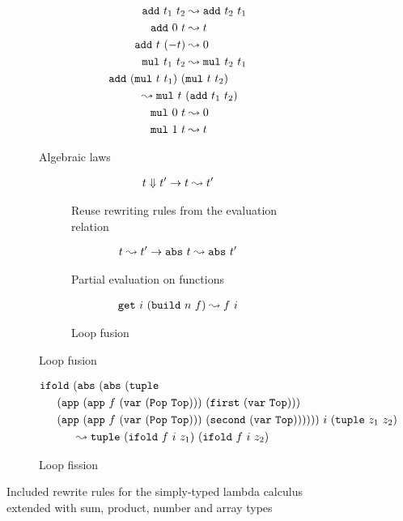 \begin{figure}[]
  \centering
  \begin{subfigure}{0.48\textwidth}
    \centering
    \begin{align*}
      \texttt{add}\ t_1\ t_2 &\leadsto \texttt{add}\ t_2\ t_1 \\
      \texttt{add}\ 0\ t &\leadsto t \\
      \texttt{add}\ t\ (-t) &\leadsto 0 \\
      \texttt{mul}\ t_1\ t_2 &\leadsto \texttt{mul}\ t_2\ t_1 \\
      \texttt{add}\ (\texttt{mul}\ t\ t_1)\ (&\texttt{mul}\ t\ t_2) \\
        \leadsto \texttt{mul}\ t\ &(\texttt{add}\ t_1\ t_2) \\
      \texttt{mul}\ 0\ t &\leadsto 0 \\
      \texttt{mul}\ 1\ t &\leadsto t
    \end{align*}
    \caption{Algebraic laws}
  \end{subfigure}
  \begin{subfigure}{0.48\textwidth}
    \begin{subfigure}{1\textwidth}
      \begin{align*}
        t \Downarrow t' \to t \leadsto t'
      \end{align*}
      \caption{Reuse rewriting rules from the evaluation relation}
    \end{subfigure}
    \begin{subfigure}{1\textwidth}
      \begin{align*}
        t \leadsto t' \to \texttt{abs}\ t \leadsto \texttt{abs}\ t'
      \end{align*}
      \caption{Partial evaluation on functions}
    \end{subfigure}
    \begin{subfigure}{1\textwidth}
      \begin{align*}
        \texttt{get}\ i\ (\texttt{build}\ n\ f)\leadsto f\ i
      \end{align*}
      \caption{Loop fusion}
    \end{subfigure}
  \end{subfigure}
  \begin{subfigure}{1\textwidth}
    \begin{align*}
      \ifold{
        &(\abs{(\abs{
          (\tuple
          {\\&\hspace{-0.5cm}(\app{(\app{f}{(\var{(\Pop{\Top}))}})}
              {(\first{(\var{\Top})})})}
          {\\&\hspace{-0.5cm}(\app{(\app{f}{(\var{(\Pop{\Top}))}})}
              {(\second{(\var{\Top})})})})})})}
        {i}{(\tuple{z_1}{z_2})} \\
        & \leadsto \tuple{(\ifold{f}{i}{z_1})}{(\ifold{f}{i}{z_2})}
    \end{align*}
    \caption{Loop fission}
  \end{subfigure}
  \caption{Included rewrite rules for the simply-typed lambda calculus extended with sum, product, number and array types}
  \label{fig:rewrite_rules}
\end{figure}


